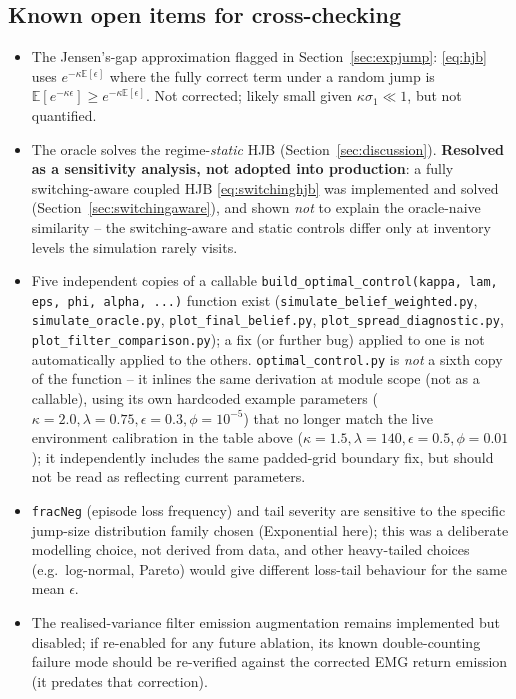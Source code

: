 \documentclass[11pt]{article}
\newcommand{\E}{\mathbb{E}}
\begin{document}
\subsection{Known open items for cross-checking}
\begin{itemize}
\item The Jensen's-gap approximation flagged in Section~\ref{sec:expjump}: \eqref{eq:hjb} uses $e^{-\kappa\E[\epsilon]}$ where the fully correct term under a random jump is $\E[e^{-\kappa\epsilon}] \ge e^{-\kappa\E[\epsilon]}$. Not corrected; likely small given $\kappa\sigma_1 \ll 1$, but not quantified.
\item The oracle solves the regime-\emph{static} HJB (Section~\ref{sec:discussion}). \textbf{Resolved as a sensitivity analysis, not adopted into production}: a fully switching-aware coupled HJB \eqref{eq:switchinghjb} was implemented and solved (Section~\ref{sec:switchingaware}), and shown \emph{not} to explain the oracle-naive similarity -- the switching-aware and static controls differ only at inventory levels the simulation rarely visits.
\item Five independent copies of a callable \texttt{build\_optimal\_control(kappa, lam, eps, phi, alpha, ...)} function exist (\texttt{simulate\_belief\_weighted.py}, \texttt{simulate\_oracle.py}, \texttt{plot\_final\_belief.py}, \texttt{plot\_spread\_diagnostic.py}, \texttt{plot\_filter\_comparison.py}); a fix (or further bug) applied to one is not automatically applied to the others. \texttt{optimal\_control.py} is \emph{not} a sixth copy of the function -- it inlines the same derivation at module scope (not as a callable), using its own hardcoded example parameters ($\kappa=2.0,\lambda=0.75,\epsilon=0.3,\phi=10^{-5}$) that no longer match the live environment calibration in the table above ($\kappa=1.5,\lambda=140,\epsilon=0.5,\phi=0.01$); it independently includes the same padded-grid boundary fix, but should not be read as reflecting current parameters.
\item \texttt{fracNeg} (episode loss frequency) and tail severity are sensitive to the specific jump-size distribution family chosen (Exponential here); this was a deliberate modelling choice, not derived from data, and other heavy-tailed choices (e.g.\ log-normal, Pareto) would give different loss-tail behaviour for the same mean $\epsilon$.
\item The realised-variance filter emission augmentation remains implemented but disabled; if re-enabled for any future ablation, its known double-counting failure mode should be re-verified against the corrected EMG return emission (it predates that correction).
\end{itemize}
\end{document}
